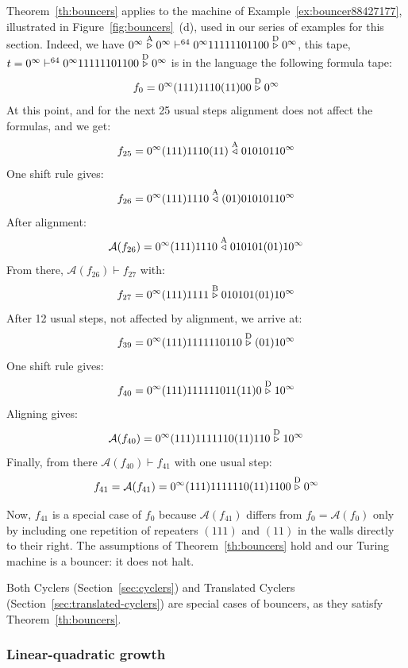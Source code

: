 \begin{example}\label{ex:bouncerTheory}
    Theorem~\ref{th:bouncers} applies to the machine of Example~\ref{ex:bouncer88427177}, illustrated in Figure~\ref{fig:bouncers}~(d), used in our series of examples for this section. Indeed, we have $0^\infty \stackrel{\text{A}}\triangleright 0^\infty \vdash^{64} 0^\infty 11111101100 \stackrel{\text{D}}\triangleright 0^\infty$, this tape, $t=0^\infty \vdash^{64} 0^\infty 11111101100 \stackrel{\text{D}}\triangleright 0^\infty$ is in the language the following formula tape:
    $$f_0 = 0^\infty (111)1110(11)00\stackrel{\text{D}}\triangleright0^\infty$$
    At this point, and for the next 25 usual steps alignment does not affect the formulas, and we get: $$f_{25} = 0^\infty (111) 1110 (11) \stackrel{\text{A}}\triangleleft 01010110^\infty$$
    One shift rule gives:
    $$ f_{26} = 0^\infty (111) 1110  \stackrel{\text{A}}\triangleleft (01) 01010110^\infty$$
    After alignment:
    $$ \mathcal{A}(f_{26}) = 0^\infty (111) 1110  \stackrel{\text{A}}\triangleleft 010101(01)10^\infty$$
    From there, $\mathcal{A}(f_{26}) \vdash f_{27}$ with:
    $$ f_{27} = 0^\infty (111) 1111  \stackrel{\text{B}}\triangleright 010101(01)10^\infty$$
    After 12 usual steps, not affected by alignment, we arrive at:
    $$f_{39} = 0^\infty (111)1111110110\stackrel{\text{D}}\triangleright(01)10^\infty$$
    One shift rule gives:
    $$f_{40} = 0^\infty (111)111111011(11)0\stackrel{\text{D}}\triangleright10^\infty$$
    Aligning gives:
    $$\mathcal{A}(f_{40}) = 0^\infty (111)1111110(11)110\stackrel{\text{D}}\triangleright10^\infty$$
    Finally, from there $\mathcal{A}(f_{40}) \vdash f_{41}$ with one usual step:
    $$f_{41} =\mathcal{A}(f_{41}) = 0^\infty (111)1111110(11)1100\stackrel{\text{D}}\triangleright0^\infty$$

    Now, $f_{41}$ is a special case of $f_{0}$ because $\mathcal{A}(f_{41})$ differs from $f_0=\mathcal{A}(f_0)$ only by including one repetition of repeaters $(111)$ and $(11)$ in the walls directly to their right. The assumptions of Theorem~\ref{th:bouncers} hold and our Turing machine is a bouncer: it does not halt.
\end{example}

\begin{remark}
    Both Cyclers (Section~\ref{sec:cyclers}) and Translated Cyclers (Section~\ref{sec:translated-cyclers}) are special cases of bouncers, as they satisfy Theorem~\ref{th:bouncers}.
\end{remark}


\subsubsection{Linear-quadratic growth}

